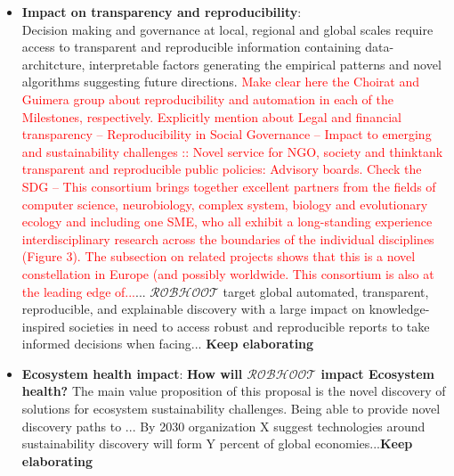 \documentclass[11pt, a4paper]{article} %
\begin{document}
{\begin{itemize}
\item {\bf Impact on transparency and reproducibility}:\\
  Decision making and governance at local, regional and global scales
  require access to transparent and reproducible information
  containing data-architcture, interpretable factors generating the
  empirical patterns and novel algorithms suggesting future
  directions. \textcolor{red}{Make clear here the Choirat and Guimera
    group about reproducibility and automation in each of the
    Milestones, respectively. Explicitly mention about Legal and
    financial transparency -- Reproducibility in Social Governance --
    Impact to emerging and sustainability challenges :: Novel service
    for NGO, society and thinktank transparent and reproducible public
    policies: Advisory boards. Check the SDG -- This consortium brings
    together excellent partners from the fields of computer science,
    neurobiology, complex system, biology and evolutionary ecology and
    including one SME, who all exhibit a long-standing experience
    interdisciplinary research across the boundaries of the individual
    disciplines (Figure 3). The subsection on related projects shows
    that this is a novel constellation in Europe (and possibly
    worldwide. This consortium is also at the leading edge
    of...}... $\mathcal{ROBHOOT}$ target global automated,
  transparent, reproducible, and explainable discovery with a large
  impact on knowledge-inspired societies in need to access robust and
  reproducible reports to take informed decisions when facing...{\bf
    Keep elaborating}
  
\item {\bf Ecosystem health impact}: {\bf How will $\mathcal{ROBHOOT}$
    impact Ecosystem health?} The main value proposition of this
  proposal is the novel discovery of solutions for ecosystem
  sustainability challenges. Being able to provide novel discovery
  paths to ... By 2030 organization X suggest technologies around
  sustainability discovery will form Y percent of global
  economies...{\bf Keep elaborating}


\end{itemize}}
\end{document}
